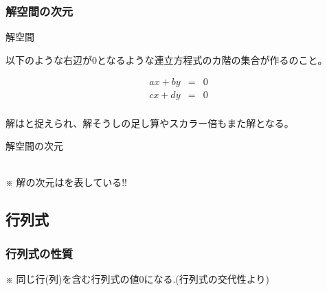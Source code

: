 \documentclass[a4paper]{jsarticle}
\begin{document}
\subsubsection{解空間の次元}
\begin{itembox}[l]{解空間}
    \begin{center}
        以下のような右辺が$0$となるような連立方程式のカ階の集合が作るのこと。
    \end{center}
    \begin{eqnarray*}
        ax+by&=&0\\
        cx+dy&=&0\\
    \end{eqnarray*}
    \begin{center}
        解はと捉えられ、解そうしの足し算やスカラー倍もまた解となる。
    \end{center}
\end{itembox}
\begin{itembox}[l]{解空間の次元}
    \begin{center}
        \\
        ※ 解の次元はを表している!!
    \end{center}
\end{itembox}
\subsection{行列式}
\subsubsection{行列式の性質}
※ 同じ行(列)を含む行列式の値$0$になる.(行列式の交代性より)
\end{document}
